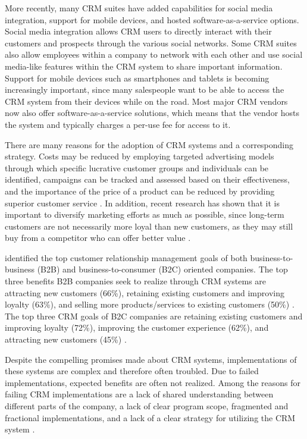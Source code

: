 More recently, many CRM suites have added capabilities for social media integration, support for mobile devices, and hosted software-as-a-service options. Social media integration allows CRM users to directly interact with their customers and prospects through the various social networks. Some CRM suites also allow employees within a company to network with each other and use social media-like features within the CRM system to share important information. Support for mobile devices such as smartphones and tablets is becoming increasingly important, since many salespeople want to be able to access the CRM system from their devices while on the road. Most major CRM vendors now also offer software-as-a-service solutions, which means that the vendor hosts the system and typically charges a per-use fee for access to it.

There are many reasons for the adoption of CRM systems and a corresponding strategy. Costs may be reduced by employing targeted advertising models through which specific lucrative customer groups and individuals can be identified, campaigns can be tracked and assessed based on their effectiveness, and the importance of the price of a product can be reduced by providing superior customer service \citep{Brown2000}. In addition, recent research has shown that it is important to diversify marketing efforts as much as possible, since long-term customers are not necessarily more loyal than new customers, as they may still buy from a competitor who can offer better value \citep[p.\ 451]{Chaffey2011}.

 identified the top customer relationship management goals of both business-to-business (B2B) and business-to-consumer (B2C) oriented companies. The top three benefits B2B companies seek to realize through CRM systems are attracting new customers (66\%), retaining existing customers and improving loyalty (63\%), and selling more products/services to existing customers (50\%) \citep{Band2010}. The top three CRM goals of B2C companies are retaining existing customers and improving loyalty (72\%), improving the customer experience (62\%), and attracting new customers (45\%) \citep{Band2010}.

Despite the compelling promises made about CRM systems, implementations of these systems are complex and therefore often troubled. Due to failed implementations, expected benefits are often not realized. Among the reasons for failing CRM implementations are a lack of shared understanding between different parts of the company, a lack of clear program scope, fragmented and fractional implementations, and a lack of a clear strategy for utilizing the CRM system \citep{Brown2000,McKenzie2001}.

